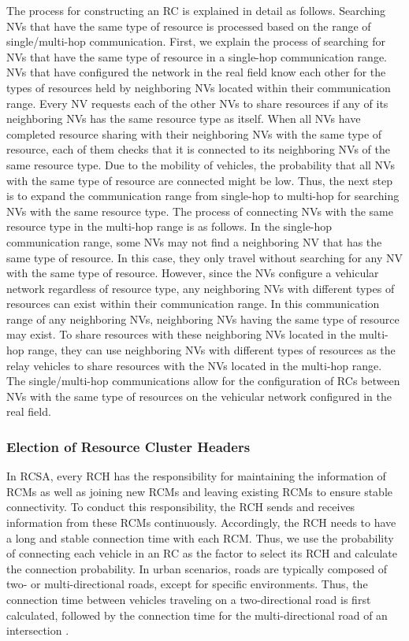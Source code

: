 \documentclass[sensors,article,accept,moreauthors,pdftex]{Definitions/mdpi}
\begin{document}
The process for constructing an RC is explained in detail as follows.
Searching NVs that have the same type of resource is processed based on the range of single/multi-hop communication.
First, we explain the process of searching for NVs that have the same type of resource in a single-hop communication range. 
NVs that have configured the network in the real field know each other for the types of resources held by neighboring NVs located within their communication range. 
Every NV requests each of the other NVs to share resources if any of its neighboring NVs has the same resource type as itself. 
When all NVs have completed resource sharing with their neighboring NVs with the same type of resource, each of them checks that it is connected to its neighboring NVs of the same resource type.
Due to the mobility of vehicles, the probability that all NVs with the same type of resource are connected might be low. 
Thus, the next step is to expand the communication range from single-hop to multi-hop for searching NVs with the same resource type.
The process of connecting NVs with the same resource type in the multi-hop range is as follows. 
In the single-hop communication range, some NVs may not find a neighboring NV that has the same type of resource. 
In this case, they only travel without searching for any NV with the same type of resource. 
However, since the NVs configure a vehicular network regardless of resource type, any neighboring NVs with different types of resources can exist within their communication range. 
In this communication range of any neighboring NVs, neighboring NVs having the same type of resource may exist. To share resources with these neighboring NVs located in the multi-hop range, they can use neighboring NVs with different types of resources as the relay vehicles to share resources with the NVs located in the multi-hop range. 
The single/multi-hop communications allow for the configuration of RCs between NVs with the same type of resources on the vehicular network configured in the real field.


\subsubsection{Election of Resource Cluster Headers} \label{HE}
In RCSA, every RCH has the responsibility for maintaining the information of RCMs as well as joining new RCMs and leaving existing RCMs to ensure stable connectivity.
To conduct this responsibility, the RCH sends and receives information from these RCMs continuously. 
Accordingly, the RCH needs to have a long and stable connection time with each RCM.
Thus, we use the probability of connecting each vehicle in an RC as the factor to select its RCH and calculate the connection probability. 
In urban scenarios, roads are typically composed of two- or multi-directional roads, except for specific environments. Thus, the connection time between vehicles traveling on a two-directional road is first calculated, followed by the connection time for the multi-directional road of an intersection \cite{Nam2022}.
\end{document}
